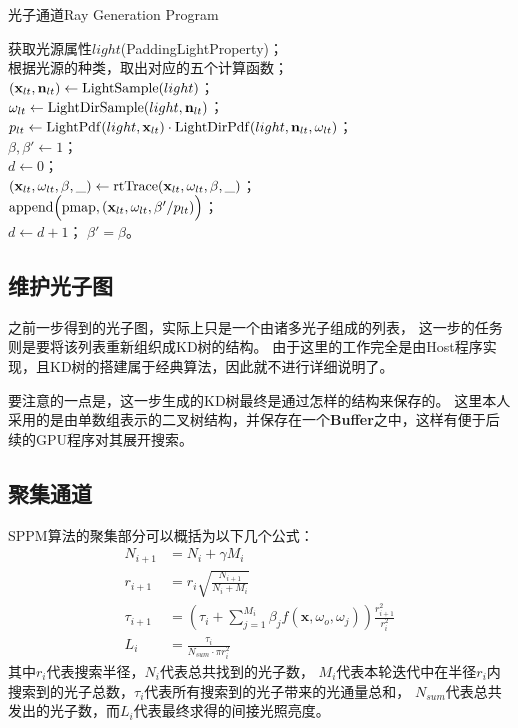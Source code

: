 \begin{algorithm}
    \caption{光子通道Ray Generation Program}
    \label{RGPPPass}

    获取光源属性$light$(PaddingLightProperty)；\\
    根据光源的种类，取出对应的五个计算函数；\\
    $(\textbf{x}_{lt}, \textbf{n}_{lt}) \leftarrow {\rm LightSample}(light)$； \\
    $\omega_{lt} \leftarrow {\rm LightDirSample}(light, \textbf{n}_{lt})$； \\
    $p_{lt} \leftarrow {\rm LightPdf}(light, \textbf{x}_{lt})\cdot {\rm LightDirPdf}(light, \textbf{n}_{lt}, \omega_{lt})$； \\
    $\beta, \beta' \leftarrow 1$；\\    
    $d \leftarrow 0$；\\
    {
        $(\textbf{x}_{lt}, \omega_{lt}, \beta, \_) \leftarrow {\rm rtTrace}(\textbf{x}_{lt}, \omega_{lt}, \beta, \_)$；\\
        {    
            ${\rm append}\Big({\rm pmap}, (\textbf{x}_{lt}, \omega_{lt}, \beta' / p_{lt})\Big)$；\\
            $d \leftarrow d+1$；
        }
        $\beta' = \beta$。
    }

\end{algorithm}

\subsection{维护光子图}
之前一步得到的光子图，实际上只是一个由诸多光子组成的列表，
这一步的任务则是要将该列表重新组织成KD树的结构。
由于这里的工作完全是由Host程序实现，且KD树的搭建属于经典算法，因此就不进行详细说明了。

要注意的一点是，这一步生成的KD树最终是通过怎样的结构来保存的。
这里本人采用的是由单数组表示的二叉树结构，并保存在一个\textbf{Buffer}之中，这样有便于后续的GPU程序对其展开搜索。

\subsection{聚集通道}

SPPM算法的聚集部分可以概括为以下几个公式\cite{hachisuka2009stochastic}：
\begin{align}
    N_{i+1} &= N_{i}+\gamma M_i \label{SPPM1}\\
    r_{i+1} &= r_i\sqrt{\frac{N_{i+1}}{N_i+M_i}} \label{SPPM2}\\
    \tau_{i+1} &= (\tau_i+\sum_{j = 1}^{M_i}\beta_jf(\textbf{x},\omega_o, \omega_j))\frac{r_{i+1}^2}{r_i^2} \label{SPPM3}\\
    L_i &= \frac{\tau_i}{N_{sum}\cdot \pi r_i^2}  
\end{align}
其中$r_i$代表搜索半径，$N_i$代表总共找到的光子数，
$M_i$代表本轮迭代中在半径$r_i$内搜索到的光子总数，$\tau_i$代表所有搜索到的光子带来的光通量总和，
$N_{sum}$代表总共发出的光子数，而$L_i$代表最终求得的间接光照亮度。


